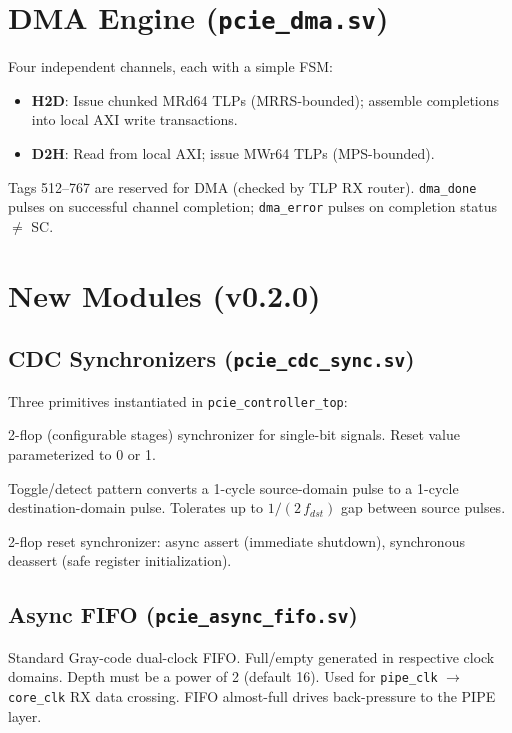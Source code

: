 \documentclass[12pt,a4paper]{report}
\begin{document}
\section{DMA Engine (\texttt{pcie\_dma.sv})}

Four independent channels, each with a simple FSM:
\begin{itemize}[noitemsep]
  \item \textbf{H2D}: Issue chunked MRd64 TLPs (MRRS-bounded);
    assemble completions into local AXI write transactions.
  \item \textbf{D2H}: Read from local AXI; issue MWr64 TLPs (MPS-bounded).
\end{itemize}
Tags 512--767 are reserved for DMA (checked by TLP RX router).
\texttt{dma\_done} pulses on successful channel completion;
\texttt{dma\_error} pulses on completion status $\neq$ SC.

\section{New Modules (v0.2.0)}

\subsection{CDC Synchronizers (\texttt{pcie\_cdc\_sync.sv})}

Three primitives instantiated in \texttt{pcie\_controller\_top}:

\begin{description}[leftmargin=3.5cm,style=nextline]
  \item[\texttt{pcie\_sync2}] 2-flop (configurable stages) synchronizer for single-bit
    signals. Reset value parameterized to 0 or 1.
  \item[\texttt{pcie\_sync\_pulse}] Toggle/detect pattern converts a 1-cycle source-domain
    pulse to a 1-cycle destination-domain pulse. Tolerates up to $1/(2\,f_{dst})$ gap
    between source pulses.
  \item[\texttt{pcie\_rst\_sync}] 2-flop reset synchronizer: async assert (immediate shutdown),
    synchronous deassert (safe register initialization).
\end{description}

\subsection{Async FIFO (\texttt{pcie\_async\_fifo.sv})}

Standard Gray-code dual-clock FIFO. Full/empty generated in respective clock domains.
Depth must be a power of 2 (default 16). Used for \texttt{pipe\_clk} $\to$
\texttt{core\_clk} RX data crossing. FIFO almost-full drives back-pressure to
the PIPE layer.
\end{document}
